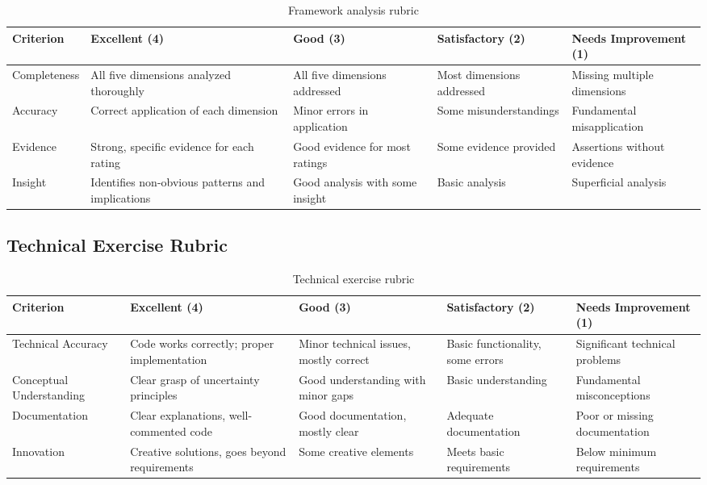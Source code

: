 \begin{table}[htbp]
\caption{Framework analysis rubric}
\label{tab:framework-rubric}
\centering
\begin{tabular}{@{}p{2.5cm}p{2.5cm}p{2.5cm}p{2.5cm}p{2.5cm}@{}}
\toprule
\textbf{Criterion} & \textbf{Excellent (4)} & \textbf{Good (3)} & \textbf{Satisfactory (2)} & \textbf{Needs Improvement (1)} \\
\midrule
Completeness & All five dimensions analyzed thoroughly & All five dimensions addressed & Most dimensions addressed & Missing multiple dimensions \\
Accuracy & Correct application of each dimension & Minor errors in application & Some misunderstandings & Fundamental misapplication \\
Evidence & Strong, specific evidence for each rating & Good evidence for most ratings & Some evidence provided & Assertions without evidence \\
Insight & Identifies non-obvious patterns and implications & Good analysis with some insight & Basic analysis & Superficial analysis \\
\bottomrule
\end{tabular}
\end{table}

\subsection{Technical Exercise Rubric}

\begin{table}[htbp]
\caption{Technical exercise rubric}
\label{tab:technical-rubric}
\centering
\begin{tabular}{@{}p{2.5cm}p{2.5cm}p{2.5cm}p{2.5cm}p{2.5cm}@{}}
\toprule
\textbf{Criterion} & \textbf{Excellent (4)} & \textbf{Good (3)} & \textbf{Satisfactory (2)} & \textbf{Needs Improvement (1)} \\
\midrule
Technical Accuracy & Code works correctly; proper implementation & Minor technical issues, mostly correct & Basic functionality, some errors & Significant technical problems \\
Conceptual Understanding & Clear grasp of uncertainty principles & Good understanding with minor gaps & Basic understanding & Fundamental misconceptions \\
Documentation & Clear explanations, well-commented code & Good documentation, mostly clear & Adequate documentation & Poor or missing documentation \\
Innovation & Creative solutions, goes beyond requirements & Some creative elements & Meets basic requirements & Below minimum requirements \\
\bottomrule
\end{tabular}
\end{table}


